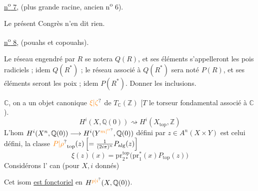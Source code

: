 \uline{n\textsuperscript{o} 7}, (plus grande racine, ancien n\textsuperscript{o} 6).

Le présent Congrès n'en dit rien.

\uline{n\textsuperscript{o} 8}, (pouahs et copouahs).

Le réseau engendré par $R$ se notera $Q(R)$, et ses éléments s'appelleront les pois radiciels ; idem $Q(R^*)$ ; le réseau associé à $Q(R^*)$ sera noté $P(R)$, et ses éléments seront les poix ; idem $P(R^*)$. Donner les inclusions.

$\mathbb C$, on a un objet canonique  $\unsure{\xi|\zeta}$ de $T_{\mathbb C}(\mathbb Z)$ [$T$ le torseur fondamental associé à $\mathbb C$).
\[
 H^i(X,\mathbb Q(0))\rightsquigarrow H^i(X_{\mathrm{top}},\mathbb Z)
\]
L'hom $H^i(X^n,\mathbb Q(0))\longrightarrow H^{i}(Y^{\unsure{m|''}},\mathbb Q(0))$ défini par  $z\in A^n(X\times Y)$ est celui défini,   la classe $\unsure{P|\rho}_{\mathrm{top}}(z)\left[=\frac{1}{(2i\pi)^n}P_{\mathrm{alg}}(z)\right]$
\[
 \boxed{\xi(z)(x)=\mathrm{pr}_{2*}^{\mathrm{top}}\bigl(\mathrm{pr}_1^*(x)P_{\mathrm{top}}(z)\bigr)}
\]
Considérons l' can (pour $X,i$ donnés)

Cet isom \uline{ est  fonctoriel} en $H^{\unsure{p|i}}(X,\mathbb Q(0))$.

